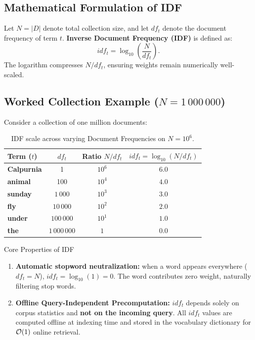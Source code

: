 \subsection{Mathematical Formulation of IDF}
Let $N = |D|$ denote total collection size, and let $df_t$ denote the document frequency of term $t$.
\textbf{Inverse Document Frequency (IDF)} is defined as:
\begin{equation}
idf_t = \log_{10}\left( \frac{N}{df_t} \right).
\end{equation}
The logarithm compresses $N / df_t$, ensuring weights remain numerically well-scaled.

\subsection[Worked Collection Example (N = 1 000 000)]{Worked Collection Example ($N = 1\,000\,000$)}

Consider a collection of one million documents:

\begin{table}[H]
\centering
\begin{tabular}{l ccc}
\toprule
\textbf{Term ($t$)} & \textbf{$df_t$} & \textbf{Ratio $N / df_t$} & \textbf{$idf_t = \log_{10}(N / df_t)$} \\
\midrule
\textbf{Calpurnia} & 1         & $10^6$ & $6.0$ \\
\textbf{animal}    & 100       & $10^4$ & $4.0$ \\
\textbf{sunday}    & $1\,000$   & $10^3$ & $3.0$ \\
\textbf{fly}       & $10\,000$  & $10^2$ & $2.0$ \\
\textbf{under}     & $100\,000$ & $10^1$ & $1.0$ \\
\textbf{the}       & $1\,000\,000$ & $1$  & $0.0$ \\
\bottomrule
\end{tabular}
\caption{IDF scale across varying Document Frequencies on $N = 10^6$.}
\label{tab:idf-values-en}
\end{table}

\begin{noteblock}{Core Properties of IDF}
\begin{enumerate}
    \item \textbf{Automatic stopword neutralization:} when a word appears everywhere ($df_t = N$), $idf_t = \log_{10}(1) = 0$. The word contributes zero weight, naturally filtering stop words.
    \item \textbf{Offline Query-Independent Precomputation:} $idf_t$ depends solely on corpus statistics and \textbf{not on the incoming query}. All $idf_t$ values are computed offline at indexing time and stored in the vocabulary dictionary for $\mathcal{O}\!\left(1\right)$ online retrieval.
\end{enumerate}
\end{noteblock}

